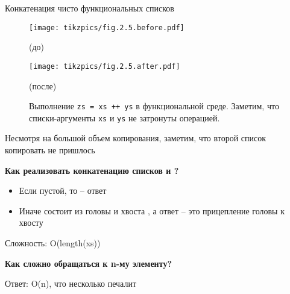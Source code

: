 %


\begin{frame}{Конкатенация чисто функциональных списков}
\begin{figure}[h]
	\centering
  \texttt{[image: tikzpics/fig.2.5.before.pdf]}\par
	(до)\par
	\vspace{0.5cm}
  \texttt{[image: tikzpics/fig.2.5.after.pdf]}\par
	(после)\par
	\vspace{0.5cm}
	\caption{Выполнение \texttt{zs = xs ++ ys} в функциональной среде. Заметим, что списки-аргументы \texttt{xs} и \texttt{ys} не затронуты операцией.
	}
	\label{fig:2.5}
\end{figure}
Несмотря на большой объем копирования, заметим, что второй список копировать не пришлось
\end{frame}


\begin{frame}{}
\textbf{Как реализовать конкатенацию  \mlinline{++} списков  и ?}
\begin{itemize}
\item Если  пустой, то  -- ответ
\item Иначе  состоит из головы  и хвоста , а ответ -- это прицепление головы  к хвосту  
\end{itemize}
Сложность: O(length(xs))
\vspace{2em}

\textbf{Как сложно обращаться к n-му элементу?}

Ответ: O(n), что несколько печалит
\vspace{2em}

\end{frame}

